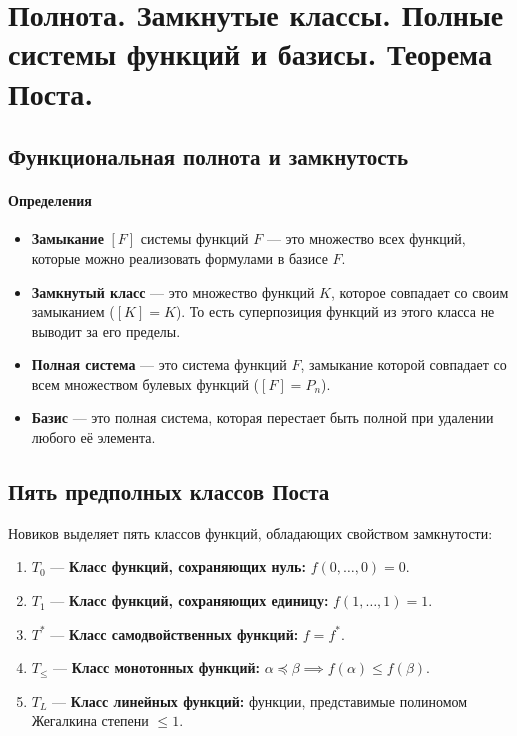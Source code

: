 \section{Полнота. Замкнутые классы. Полные системы функций и базисы. Теорема Поста.}

\subsection*{Функциональная полнота и замкнутость}

\paragraph{Определения}
\begin{itemize}
    \item \textbf{Замыкание} $[F]$ системы функций $F$ — это множество всех функций, которые можно реализовать формулами в базисе $F$.
    \item \textbf{Замкнутый класс} — это множество функций $K$, которое совпадает со своим замыканием ($[K] = K$). То есть суперпозиция функций из этого класса не выводит за его пределы.
    \item \textbf{Полная система} — это система функций $F$, замыкание которой совпадает со всем множеством булевых функций ($[F] = P_n$).
    \item \textbf{Базис} — это полная система, которая перестает быть полной при удалении любого её элемента.
\end{itemize}

\subsection*{Пять предполных классов Поста}

Новиков выделяет пять классов функций, обладающих свойством замкнутости:
\begin{enumerate}
    \item $T_0$ — \textbf{Класс функций, сохраняющих нуль:} $f(0, \dots, 0) = 0$.
    \item $T_1$ — \textbf{Класс функций, сохраняющих единицу:} $f(1, \dots, 1) = 1$.
    \item $T^*$ — \textbf{Класс самодвойственных функций:} $f = f^*$.
    \item $T_{\le}$ — \textbf{Класс монотонных функций:} $\alpha \preceq \beta \implies f(\alpha) \le f(\beta)$.
    \item $T_L$ — \textbf{Класс линейных функций:} функции, представимые полиномом Жегалкина степени $\le 1$.
\end{enumerate}

